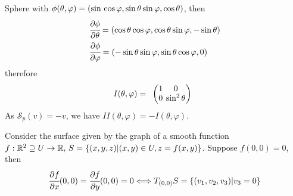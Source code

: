 \documentclass[10pt]{article}
\begin{document}
		\begin{example}
			Sphere with $\phi(\theta,\varphi) = (\sin\thinspace\cos\varphi, \sin\theta\sin\varphi, \cos\theta)$, then
			\begin{equation*}
				\begin{aligned}
					&\cfrac{\partial\phi}{\partial\theta} = (\cos\theta\cos\varphi, \cos\theta\sin\varphi, -\sin\theta) \\
					&\cfrac{\partial\phi}{\partial\varphi} = (-\sin\theta\sin\varphi, \sin\theta\cos\varphi, 0)
				\end{aligned}
			\end{equation*}
			therefore
			\begin{equation*}
				\begin{aligned}
					I(\theta, \varphi) = 
					\normalsize{
						\begin{array}{lc}
							\setlength{\arraycolsep}{2pt}
							\begingroup
							\renewcommand*{\arraystretch}{0.89}
							\begin{pmatrix}
								1 & 0 \\
								0 & \sin^2\theta \\
							\end{pmatrix}
							\endgroup
						\end{array}
					}
				\end{aligned}
			\end{equation*}
			As $\mathcal{S}_p(v) = -v$, we have $II(\theta,\varphi) = -I(\theta, \varphi)$.
		\end{example}
            \begin{proposition}
                Consider the surface given by the graph of a smooth function $f: \mathbb{R}^2\supseteq U\rightarrow\mathbb{R},\thinspace S=\{(x,y,z)|(x,y)\in U, z=f(x,y)\}$. Suppose $f(0,0)=0$, then
                \begin{equation*}
                    \begin{aligned}
                        \cfrac{\partial f}{\partial x}(0,0) = \cfrac{\partial f}{\partial y}(0,0) = 0\Longleftrightarrow T_{(0,0)}S = \{(v_1, v_2, v_3)|v_3=0\}
                    \end{aligned}
                \end{equation*}
            \end{proposition}
\end{document}
